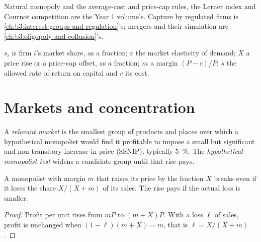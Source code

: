 \begin{recall}
Natural monopoly and the average-cost and price-cap rules, the Lerner index and
Cournot competition are the Year 1 volume's. Capture by regulated firms is
\cref{ch:b3:interest-groups-and-regulation}'s; mergers and their simulation are
\cref{ch:b3:oligopoly-and-collusion}'s.
\end{recall}

\begin{notation}\label{not:b3:competition-policy:symbols}
$s_i$ is firm $i$'s market share, as a fraction; $\varepsilon$ the market elasticity of demand; $X$ a
price rise or a price-cap offset, as a fraction; $m$ a margin $(P - c)/P$; $s$ the allowed rate of return
on capital and $r$ its cost.
\end{notation}

\section{Markets and concentration}\label{sec:b3:competition-policy:markets}

\begin{definition}\label{def:b3:competition-policy:market}
A \emph{relevant market} is the smallest group of products and places over which a
hypothetical monopolist would find it profitable to impose a small but significant
and non-transitory increase in price (SSNIP), typically 5~\%. The \emph{hypothetical
monopolist test} widens a candidate group until that rise pays.
\end{definition}

\begin{proposition}\label{prop:b3:competition-policy:critical-loss}
A monopolist with margin $m$ that raises its price by the fraction $X$ breaks even if it loses the
share $X/(X + m)$ of its sales. The rise pays if the actual loss is smaller.
\end{proposition}

\begin{proof}
Profit per unit rises from $mP$ to $(m + X)P$. With a loss $\ell$ of sales, profit is unchanged when
$(1 - \ell)(m + X) = m$, that is $\ell = X/(X + m)$.
\end{proof}

